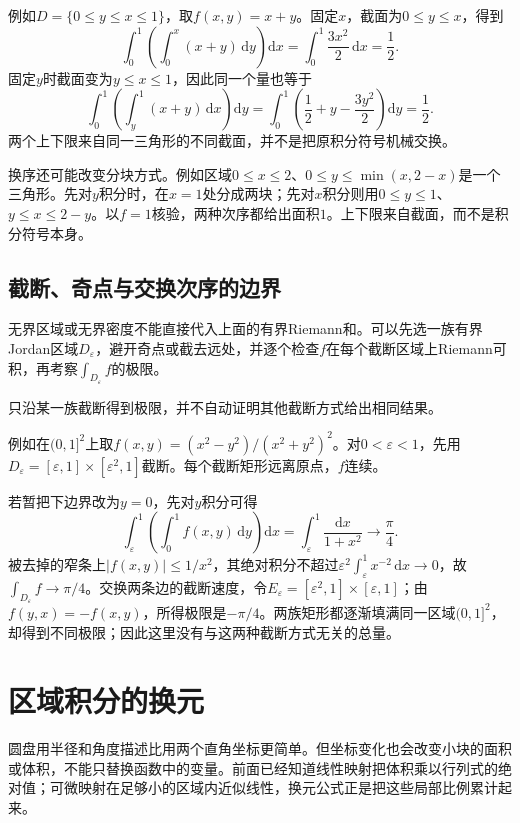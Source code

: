 例如$D=\{0\leq y\leq x\leq1\}$，取$f(x,y)=x+y$。固定$x$，截面为$0\leq y\leq x$，得到
\[
 \int_0^1\left(\int_0^x(x+y)\,\mathrm dy\right)\mathrm dx
 =\int_0^1\frac{3x^2}{2}\,\mathrm dx=\frac12.
\]
固定$y$时截面变为$y\leq x\leq1$，因此同一个量也等于
\[
 \int_0^1\left(\int_y^1(x+y)\,\mathrm dx\right)\mathrm dy
 =\int_0^1\left(\frac12+y-\frac{3y^2}{2}\right)\mathrm dy=\frac12.
\]
两个上下限来自同一三角形的不同截面，并不是把原积分符号机械交换。

换序还可能改变分块方式。例如区域$0\leq x\leq2$、$0\leq y\leq\min(x,2-x)$是一个三角形。先对$y$积分时，在$x=1$处分成两块；先对$x$积分则用$0\leq y\leq1$、$y\leq x\leq2-y$。以$f=1$核验，两种次序都给出面积$1$。上下限来自截面，而不是积分符号本身。

\subsection{截断、奇点与交换次序的边界}

无界区域或无界密度不能直接代入上面的有界Riemann和。可以先选一族有界Jordan区域$D_\varepsilon$，避开奇点或截去远处，并逐个检查$f$在每个截断区域上Riemann可积，再考察$\int_{D_\varepsilon}f$的极限。

只沿某一族截断得到极限，并不自动证明其他截断方式给出相同结果。

例如在$(0,1]^2$上取$f(x,y)=(x^2-y^2)/(x^2+y^2)^2$。对$0<\varepsilon<1$，先用$D_\varepsilon=[\varepsilon,1]\times[\varepsilon^2,1]$截断。每个截断矩形远离原点，$f$连续。

若暂把下边界改为$y=0$，先对$y$积分可得
\[
 \int_\varepsilon^1\left(\int_0^1 f(x,y)\,\mathrm dy\right)\mathrm dx
 =\int_\varepsilon^1\frac{\mathrm dx}{1+x^2}
 \longrightarrow\frac\pi4.
\]
被去掉的窄条上$|f(x,y)|\leq1/x^2$，其绝对积分不超过$\varepsilon^2\int_\varepsilon^1x^{-2}\,\mathrm dx\to0$，故$\int_{D_\varepsilon}f\to\pi/4$。交换两条边的截断速度，令$E_\varepsilon=[\varepsilon^2,1]\times[\varepsilon,1]$；由$f(y,x)=-f(x,y)$，所得极限是$-\pi/4$。两族矩形都逐渐填满同一区域$(0,1]^2$，却得到不同极限；因此这里没有与这两种截断方式无关的总量。


\section{区域积分的换元}
\label{sec:classical-change-variables}

圆盘用半径和角度描述比用两个直角坐标更简单。但坐标变化也会改变小块的面积或体积，不能只替换函数中的变量。前面已经知道线性映射把体积乘以行列式的绝对值；可微映射在足够小的区域内近似线性，换元公式正是把这些局部比例累计起来。

